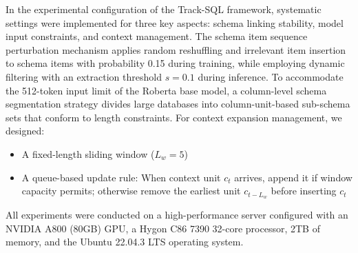 \documentclass[11pt]{article}
\begin{document}
In the experimental configuration of the Track-SQL framework, systematic settings were implemented for three key aspects: schema linking stability, model input constraints, and context management. The schema item sequence perturbation mechanism applies random reshuffling and irrelevant item insertion to schema items with probability 0.15 during training, while employing dynamic filtering with an extraction threshold \(s=0.1\) during inference. To accommodate the 512-token input limit of the Roberta base model, a column-level schema segmentation strategy divides large databases into column-unit-based sub-schema sets that conform to length constraints. For context expansion management, we designed:
\begin{itemize}
    \item A fixed-length sliding window (\(L_{w}=5\))
    \item A queue-based update rule: When context unit \(c_t\) arrives, append it if window capacity permits; otherwise remove the earliest unit \(c_{t-L_{w}}\) before inserting \(c_t\)
\end{itemize}

All experiments were conducted on a high-performance server configured with an NVIDIA A800 (80GB) GPU, a Hygon C86 7390 32-core processor, 2TB of memory, and the Ubuntu 22.04.3 LTS operating system.
\end{document}
